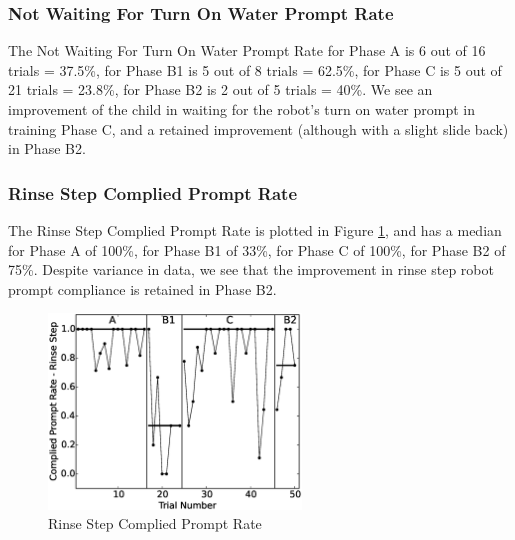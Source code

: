 \subsubsection{Not Waiting For Turn On Water Prompt Rate}
The Not Waiting For Turn On Water Prompt Rate for Phase A is 6 out of 16 trials = 37.5\%, for Phase B1 is 5 out of 8 trials = 62.5\%, for Phase C is 5 out of 21 trials = 23.8\%, for Phase B2 is 2 out of 5 trials = 40\%.  We see an improvement of the child in waiting for the robot's turn on water prompt in training Phase C, and a retained improvement (although with a slight slide back) in Phase B2.

\subsubsection{Rinse Step Complied Prompt Rate}
The Rinse Step Complied Prompt Rate is plotted in Figure \ref{fig:5CompliedPromptRate-RinseStep}, and has a median for Phase A of 100\%, for Phase B1 of 33\%, for Phase C of 100\%, for Phase B2 of 75\%.  Despite variance in data, we see that the improvement in rinse step robot prompt compliance is retained in Phase B2.
\begin{figure} [H]
	\centering
	\includegraphics[width=0.6\textwidth]{./img/data_analysis/5CompliedPromptRate-RinseStep.eps}
	\caption{Rinse Step Complied Prompt Rate}
	\label{fig:5CompliedPromptRate-RinseStep}
\end{figure}

